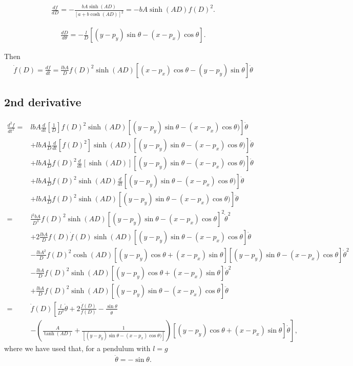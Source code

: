 \documentclass[12pt]{article}
\begin{document}
\begin{align}
  \frac{df}{dD}=-\frac{bA\sinh(AD)}{\left[a+b\cosh(AD)\right]^2}=-bA\sinh(AD)f(D)^2.
\end{align}

\begin{align}
  \frac{dD}{d\theta}=-\frac{l}{D}[(y-p_y)\sin\theta-(x-p_x)\cos\theta].
\end{align}

Then
\begin{align}
  \dot{f}(D)=\frac{df}{dt}=\frac{lbA}{D}f(D)^2\sinh(AD)[(x-p_x)\cos\theta-(y-p_y)\sin\theta]\dot{\theta}
\end{align}

\subsection{2nd derivative}
\begin{align}
  \frac{d^2f}{dt^2}=&lbA\frac{d}{dt}\left[\frac{1}{D}\right]f(D)^2\sinh(AD)[(y-p_y)\sin\theta-(x-p_x)\cos\theta)]\dot{\theta}\nonumber\\
  &+lbA\frac{1}{D}\frac{d}{dt}\left[f(D)^2\right]\sinh(AD)[(y-p_y)\sin\theta-(x-p_x)\cos\theta)]\dot{\theta}\nonumber\\
  &+lbA\frac{1}{D}f(D)^2\frac{d}{dt}\left[\sinh(AD)\right][(y-p_y)\sin\theta-(x-p_x)\cos\theta)]\dot{\theta}\nonumber\\
  &+lbA\frac{1}{D}f(D)^2\sinh(AD)\frac{d}{dt}\left[(y-p_y)\sin\theta-(x-p_x)\cos\theta)\right]\dot{\theta}\nonumber\\
  &+lbA\frac{1}{D}f(D)^2\sinh(AD)\left[(y-p_y)\sin\theta-(x-p_x)\cos\theta)\right]\ddot{\theta}\nonumber\\
  =&\frac{l^2bA}{D^3}f(D)^2\sinh(AD)[(y-p_y)\sin\theta-(x-p_x)\cos\theta]^2\dot{\theta}^2\nonumber\\
  &+2\frac{lbA}{D}f(D)\dot{f}(D)\sinh(AD)[(y-p_y)\sin\theta-(x-p_x)\cos\theta]\dot{\theta}\nonumber\\
  &-\frac{lbA^2}{D}f(D)^2\cosh(AD)[(y-p_y)\cos\theta+(x-p_x)\sin\theta][(y-p_y)\sin\theta-(x-p_x)\cos\theta]\dot{\theta}^2\nonumber\\
  &-\frac{lbA}{D}f(D)^2\sinh(AD)\left[(y-p_y)\cos\theta+(x-p_x)\sin\theta\right]\dot{\theta}^2\nonumber\\
  &+\frac{lbA}{D}f(D)^2\sinh(AD)\left[(y-p_y)\sin\theta-(x-p_x)\cos\theta\right]\ddot{\theta}\nonumber\\
  =&\dot{f}(D)\left[\frac{l}{D^2}\dot{\theta}+2\frac{\dot{f}(D)}{f(D)}-\frac{\sin\theta}{\dot{\theta}}\right.\nonumber\\
    &\left.-\left(\frac{A}{\tanh(AD)}+\frac{1}{[(y-p_y)\sin\theta-(x-p_x)\cos\theta)]}\right)\left[(y-p_y)\cos\theta+(x-p_x)\sin\theta\right]\dot{\theta}\right],
\end{align}
where we have used that, for a pendulum with $l=g$
\begin{align}
  \ddot{\theta}=-\sin\theta.
\end{align}
\end{document}
